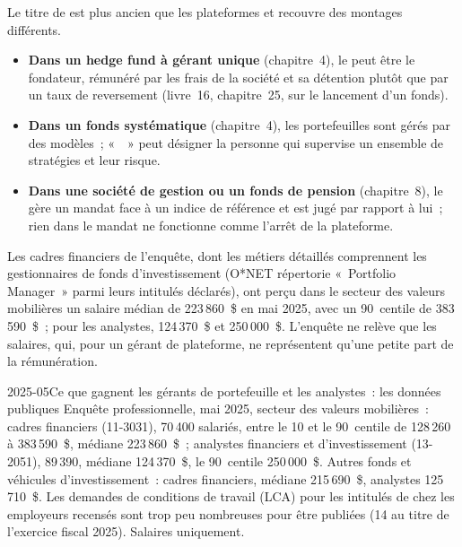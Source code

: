Le titre de  est plus ancien que les plateformes et recouvre des montages différents.
\begin{itemize}
\item \textbf{Dans un hedge fund à gérant unique} (chapitre~4), le  peut être le fondateur, rémunéré par
les frais de la société et sa détention plutôt que par un taux de reversement (livre~16, chapitre~25, sur le lancement d'un fonds).
\item \textbf{Dans un fonds systématique} (chapitre~4), les portefeuilles sont gérés par des modèles~; «~~» peut désigner la personne
qui supervise un ensemble de stratégies et leur risque.
\item \textbf{Dans une société de gestion ou un fonds de pension} (chapitre~8), le  gère un mandat face à un indice de référence
et est jugé par rapport à lui~; rien dans le mandat ne fonctionne comme l'arrêt de la plateforme.
\end{itemize}
Les cadres financiers de l'enquête, dont les métiers détaillés comprennent les gestionnaires de fonds d'investissement (O*NET répertorie «~Portfolio
Manager~» parmi leurs intitulés déclarés), ont perçu dans le secteur des valeurs mobilières un salaire médian de
223\,860~\$ en mai 2025, avec un 90~centile de 383\,590~\$~; pour les analystes, 124\,370~\$ et 250\,000~\$. L'enquête ne relève
que les salaires, qui, pour un gérant de plateforme, ne représentent qu'une petite part de la rémunération.

\begin{dated}{2025-05}{Ce que gagnent les gérants de portefeuille et les analystes~: les données publiques}\label{dat:in:portfolio-manager-and-pod-analyst:pay}
Enquête professionnelle, mai 2025, secteur des valeurs mobilières~: cadres financiers (11-3031), 70\,400 salariés, entre le 10 et le 90~centile
de 128\,260 à 383\,590~\$, médiane 223\,860~\$~; analystes financiers et d'investissement (13-2051), 89\,390, médiane 124\,370~\$, le 90~centile
250\,000~\$. Autres fonds et véhicules d'investissement~: cadres financiers, médiane 215\,690~\$, analystes 125\,710~\$. Les
demandes de conditions de travail (LCA) pour les intitulés de  chez les employeurs recensés sont trop peu nombreuses pour être publiées (14 au titre de l'exercice
fiscal 2025). Salaires uniquement.
\end{dated}


